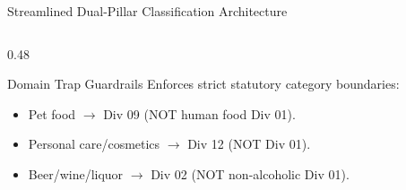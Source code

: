 \documentclass[aspectratio=169, 10pt]{beamer}
\begin{document}
\begin{frame}[shrink=8]{Streamlined Dual-Pillar Classification Architecture}
\begin{columns}
\begin{column}{0.48\textwidth}
      \begin{alertblock}{Domain Trap Guardrails}
        \footnotesize
        Enforces strict statutory category boundaries:
        \begin{itemize}
          \item Pet food $\rightarrow$ Div 09 (NOT human food Div 01).
          \item Personal care/cosmetics $\rightarrow$ Div 12 (NOT Div 01).
          \item Beer/wine/liquor $\rightarrow$ Div 02 (NOT non-alcoholic Div 01).
        \end{itemize}
      \end{alertblock}
    \end{column}
  \end{columns}
\end{frame}
\end{document}
